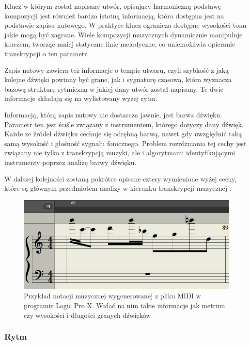 \documentclass[12pt,a4paper,twoside]{mwart}
\begin{document}
Klucz w którym został napisany utwór, opisujący harmoniczną podstawę kompozycji jest również bardzo istotną informacją, która dostępna jest na podstawie zapisu nutowego. W praktyce klucz ogranicza dostępne wysokości tonu jakie mogą być zagrane. Wiele kompozycji muzycznych dynamicznie manipuluje kluczem, tworząc mniej statyczne linie melodyczne, co uniemożliwia opieranie transkrypcji o ten parametr.

Zapis nutowy zawiera też informacje o tempie utworu, czyli szybkość z jaką kolejne dźwięki powinny być grane, jak i sygnaturę czasową, która wyznacza bazową strukturę rytmiczną w jakiej dany utwór został napisany. Te dwie informacje składają się na wylistowany wyżej rytm.

Informacją, którą zapis nutowy nie dostarcza jawnie, jest barwa dźwięku. Parametr ten jest ściśle związany z instrumentem, którego dotyczy dany dźwięk. Każde ze źródeł dźwięku cechuje się odrębną barwą, nawet gdy uwzględnić taką samą wysokość i głośność sygnału fonicznego. Problem rozróżniania tej cechy jest związany nie tylko z transkrypcją muzyki, ale i algorytmami identyfikującymi instrumenty poprzez analizę barwy dźwięku.

W dalszej kolejności zostaną pokrótce opisane cztery wymienione wyżej cechy, które są głównym przedmiotem analizy w kierunku transkrypcji muzycznej \cite[63]{Homerecording:DlaKazdego}.
\begin{figure}[H]
  \begin{center}
    \includegraphics[scale=0.5]{images/pieciolinia_logic.png}
    \caption{Przykład notacji muzycznej wygenerowanej z pliku MIDI w programie Logic Pro X. Widać na nim takie informacje jak metrum czy wysokości i długości granych dźwięków}
  \end{center}
\end{figure}

\subsubsection{Rytm}
\end{document}
